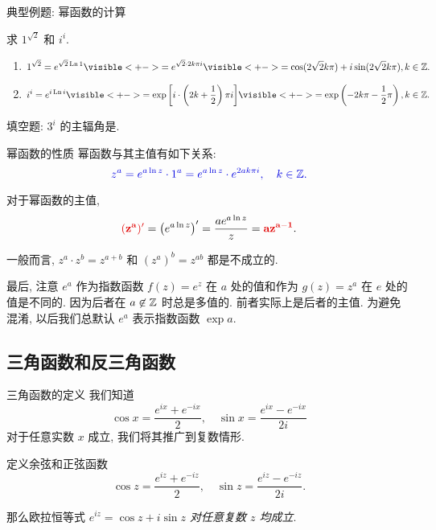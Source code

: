 \begin{frame}{典型例题: 幂函数的计算}
	\onslide<+->
	\begin{example}
		求 $1^{\sqrt 2}$ 和 $i^i$.
	\end{example}
	\onslide<+->
	\begin{solution}
		\begin{enumerate}
			\item
			\[
				1^{\sqrt2}=e^{\sqrt2\Ln1}
				\visible<+->{=e^{\sqrt 2\cdot 2k\pi i}}
				\visible<+->{=\cos(2\sqrt 2k\pi)+i\sin(2\sqrt 2k\pi), k\in\BZ.}\]
			\item
			\[
				i^i=e^{i\Ln i}
				\visible<+->{=\exp\left[i\cdot\left(2k+\half\right)\pi i\right]}
				\visible<+->{=\exp\left(-2k\pi-\half\pi\right), k\in\BZ.}\]
		\end{enumerate}
	\end{solution}
	\onslide<+->
	\begin{exercise}
		填空题: $3^i$ 的主辐角是.
	\end{exercise}
\end{frame}


\begin{frame}{幂函数的性质}
	幂函数与其主值有如下关系:
	\onslide<+->
	\[\emph{z^a=e^{a\ln z}\cdot 1^a
	=e^{a\ln z}\cdot e^{2ak\pi i},\quad k\in\BZ.}\]

	\onslide<+->
	对于幂函数的主值,
	\[\alert{(z^a)'}=\left(e^{a\ln z}\right)'=\frac{ae^{a\ln z}}z=\alert{az^{a-1}}.\]

	\onslide<+->
	一般而言, $z^a\cdot z^b=z^{a+b}$ 和 $(z^a)^b=z^{ab}$ 都是不成立的.

	\onslide<+->
	最后, 注意 $e^a$ 作为指数函数 $f(z)=e^z$ 在 $a$ 处的值和作为 $g(z)=z^a$ 在 $e$ 处的值是\alert{不同}的.
	\onslide<+->
	因为后者在 $a\not\in{\mathbb{Z}}$ 时总是多值的.
	\onslide<+->
	前者实际上是后者的主值.
	\onslide<+->
	为避免混淆, 以后我们总\alert{默认 $e^a$ 表示指数函数 $\exp a$}.
\end{frame}


\subsection{三角函数和反三角函数}

\begin{frame}{三角函数的定义}
	\onslide<+->
	我们知道
	\[\cos x=\frac{e^{ix}+e^{-ix}}2,\quad
	\sin x=\frac{e^{ix}-e^{-ix}}{2i}\]
	对于任意实数 $x$ 成立,
	\onslide<+->
	我们将其推广到复数情形.
	\onslide<+->
	\begin{definition}[余弦和正弦函数]
		定义余弦和正弦函数
		\[\displaystyle\cos z=\frac{e^{iz}+e^{-iz}}2,\quad
		\sin z=\frac{e^{iz}-e^{-iz}}{2i}.\]
	\end{definition}

	\onslide<+->
	那么欧拉恒等式 \emph{$e^{iz}=\cos z+i\sin z$ 对任意复数 $z$ 均成立}.
\end{frame}


